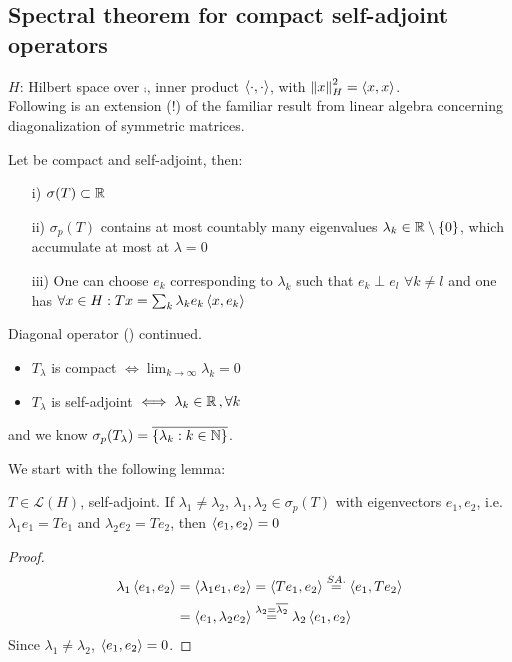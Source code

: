 \documentclass{article}
\begin{document}
\subsection{Spectral theorem for compact self-adjoint operators}
$H$: Hilbert space over $\comp$, inner product $\left<{\cdot},{\cdot}\right>$, with $\left\|{x}\right\|^2_H=\left<{x},{x}\right>$. \\
Following is an extension (!) of the familiar result from linear algebra concerning diagonalization of symmetric matrices.
\begin{theorem}\nl
\label{riesz schauder}
	Let   be compact and self-adjoint, then:
	\begin{itemize}
		\item [i)] $\sigma(T)\subset\mathbb{R}$
		\item [ii)] $\sigma_p(T)$ contains at most countably many eigenvalues $\lambda_k\in\mathbb{R}\setminus\{0\}$, which accumulate at most at $\lambda=0$
		\item [iii)] One can choose $e_k$  corresponding to $\lambda_k$ such that $e_k\perp e_l$ $\forall k\neq l$ and one has $\forall x\in H:Tx=\sum_k \lambda_k e_k\left<{x},{e_k}\right>$
	\end{itemize}
\end{theorem}
\begin{example}\nl
	Diagonal operator ()  continued.\\
	\begin{itemize}
	    \item $T_\lambda$ is compact $\iff \lim_{k\to\infty}\lambda_k=0$
	    \item $T_\lambda$ is self-adjoint $\iff \lambda_k\in\mathbb{R}\,,\forall k$
	\end{itemize}
	 and we know $\sigma_p(T_\lambda)=\overline{\{\lambda_k:k\in\mathbb{N}\}}$.
\end{example}
We start with the following lemma:
\begin{lemma}[Lemma 1]
\label{lemma: eigenvectors are orthogonal for T self-adjoint}
	$T\in\mathcal{L}(H)$, self-adjoint. If $\lambda_1\neq\lambda_2$, $\lambda_1,\lambda_2\in\sigma_p(T)$ with eigenvectors $e_1,e_2$, i.e. $\lambda_1 e_1=Te_1$ and $\lambda_2e_2=Te_2$, then $\left<{e_1},{e_2}\right>=0$
\end{lemma}
\begin{proof}
   		\begin{equation}
			\begin{split}
			\lambda_1\left<{e_1},{e_2}\right>&=\left<{\lambda_1e_1},{e_2}\right>=\left<{Te_1},{e_2}\right>\stackrel{SA.}{=}\left<{e_1},{Te_2}\right>\\
			&=\left<{e_1},{\lambda_2e_2}\right>\stackrel{\lambda_2=\overline{\lambda_2}}{=}\lambda_2\left<{e_1},{e_2}\right>
			\end{split}
		\end{equation}
		Since $\lambda_1\neq\lambda_2$, $\left<{e_1},{e_2}\right>=0$. 
\end{proof}
\end{document}
